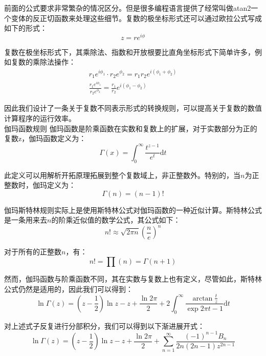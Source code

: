   前面的公式要求非常繁杂的情况区分。但是很多编程语言提供了经常叫做atan2一个变体的反正切函数来处理这些细节。复数的极坐标形式还可以通过欧拉公式写成如下的形式：
  \begin{equation*}
    z = r e^{i\phi}
  \end{equation*}

  复数在极坐标形式下，其乘除法、指数和开放根要比直角坐标形式下简单许多，例如复数的乘除法操作：
  \begin{gather*}
    r_1 e^{i\phi_1} \cdot r_2 e^{\phi_2} = r_1r_2 e^{i(\phi_1+\phi_2)} \\
    \frac{r_1 e^{i\phi_1}}{r_2 e^{\phi_2}} = \frac{r_1}{r_2}e^{i(\phi_1-\phi_2)}
  \end{gather*}

  因此我们设计了一条关于复数不同表示形式的转换规则，可以提高关于复数的数值计算程序的运行效率。\\

{\kaishu 伽玛函数规则} 伽玛函数\cite{Karatsuba1993}是阶乘函数在实数和复数上的扩展，对于实数部分为正的复数z，伽玛函数定义为：
\begin{equation*}
  \Gamma (x) = \int_{0}^{\infty} \frac{t^{z-1}}{e^t} \mathrm{d}t 
\end{equation*}

此定义可以用解析开拓原理拓展到整个复数域上，非正整数外。特别的，当$n$为正整数时，伽玛定义为：
\begin{equation*}
  \Gamma (n) = (n-1)!
\end{equation*}

伽玛斯特林规则实际上是使用斯特林公式\cite{10.2307/2308012}对伽玛函数的一种近似计算。斯特林公式是一条用来去$n$的阶乘近似值的数学公式，其公式如下：
\begin{equation*}
  n! \approx \sqrt{2\pi n}(\frac{n}{e})^n
\end{equation*}

对于所有的正整数$n$，有：
\begin{equation*}
  n! = \prod (n) = \Gamma (n+1)
\end{equation*}

然而，伽玛函数与阶乘函数不同，其在实数与复数上也有定义，尽管如此，斯特林公式仍然是适用的，因此我们可以得到：
\begin{equation*}
  \ln \Gamma(z) = (z-\frac{1}{2})\ln z - z + \frac{\ln 2 \pi}{2} + 2 \int_{0}^{\infty}\frac{\arctan \frac{t}{z}}{\exp{2\pi t}-1} \mathrm{d} t
\end{equation*}

对上述式子反复进行分部积分，我们可以得到以下渐进展开式：
\begin{equation*}
  \ln \Gamma(z) = (z-\frac{1}{2})\ln z - z + \frac{\ln 2 \pi}{2} + \sum_{n=1}^{\infty}\frac{(-1)^{n-1}B_n}{2n(2n-1)z^{2n-1}}
\end{equation*}

